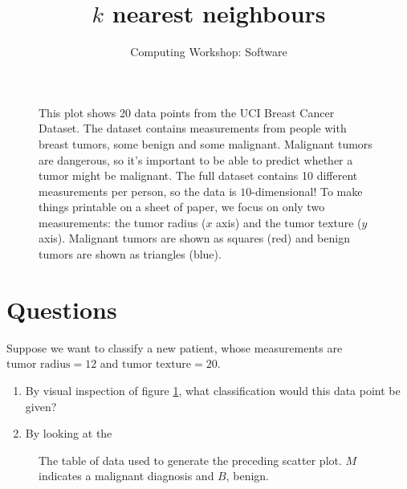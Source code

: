 \documentclass[11pt]{article}
\title{$k$ nearest neighbours}
\author{Computing Workshop: Software}
\begin{document}
\maketitle

\begin{figure}[h]
  \centering
  \caption{%
    This plot shows 20 data points from the UCI Breast Cancer Dataset.
    The dataset contains measurements from people with breast tumors, some
    benign and some malignant. Malignant tumors are dangerous, so it's important
    to be able to predict whether a tumor might be malignant.
    The full dataset contains 10 different measurements per person, so the data
    is $10$-dimensional! To make things printable on a sheet of paper, we focus
    on only two measurements: the tumor radius ($x$ axis) and the tumor texture
    ($y$ axis).%
    Malignant tumors are shown as squares (red) and benign tumors are shown as
    triangles (blue).
  }
  \label{fig:chart}
\end{figure}

\section*{Questions}

Suppose we want to classify a new patient, whose measurements are
$\text{tumor radius} = 12$ and $\text{tumor texture} = 20$.

\begin{enumerate}
\item
  By visual inspection of figure \ref{fig:chart}, what classification would this
  data point be given?
\item
  By looking at the 
\end{enumerate}

\begin{figure}[h]
  \centering
  \caption{%
    The table of data used to generate the preceding scatter plot.
    $M$ indicates a malignant diagnosis and $B$, benign.%
  }
\end{figure}
\end{document}
